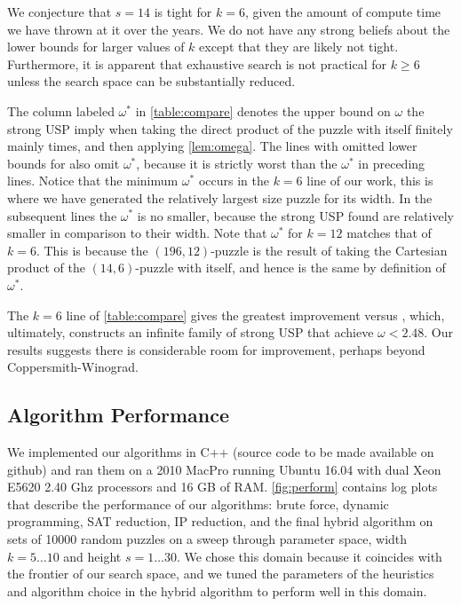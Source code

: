 \documentclass[11pt]{article}
\begin{document}
We conjecture that $s = 14$ is tight for $k = 6$, given the amount of
compute time we have thrown at it over the years.
We do
not have any strong beliefs about the lower bounds for larger values
of $k$ except that they are likely not tight.  Furthermore, it is
apparent that exhaustive search is not practical for $k \ge 6$
unless the search space can be substantially reduced.

The column labeled $\omega^*$ in \autoref{table:compare} denotes the
upper bound on $\omega$ the strong USP imply when taking the direct
product of the puzzle with itself finitely mainly times, and then
applying \autoref{lem:omega}.
The
lines with omitted lower bounds for \cite{cksu05} also omit
$\omega^*$, because it is strictly worst than the $\omega^*$ in
preceding lines.  Notice that the minimum $\omega^*$ occurs in the $k
= 6$ line of our work, this is where we have generated the relatively
largest size puzzle for its width.  In the subsequent lines the
$\omega^*$ is no smaller, because the strong USP found are relatively
smaller in comparison to their width.  Note that $\omega^*$ for $k =
12$ matches that of $k = 6$.  This is because the $(196, 12)$-puzzle
is the result of taking the Cartesian product of the $(14,6)$-puzzle
with itself, and hence is the same by definition of $\omega^*$.

The $k = 6$ line of \autoref{table:compare} gives the greatest
improvement versus \cite[Proposition 3.8]{cksu05}, which, ultimately,
constructs an infinite family of strong USP that achieve $\omega <
2.48$. Our results suggests there is considerable room for
improvement, perhaps beyond Coppersmith-Winograd.


\subsection{Algorithm Performance}
\label{subsec:performance}

We implemented our algorithms in C++ (source code to be made
  available on github) and ran them on a 2010 MacPro running Ubuntu
16.04 with dual Xeon E5620 2.40 Ghz processors and 16 GB of
RAM. \autoref{fig:perform} contains log plots that describe the
performance of our algorithms: brute force, dynamic programming, SAT
reduction, IP reduction, and the final hybrid algorithm on sets of
10000 random puzzles on a sweep through parameter space, width $k = 5
\ldots 10$ and height $s = 1 \ldots 30$.  We chose this domain because
it coincides with the frontier of our search space, and we tuned the
parameters of the heuristics and algorithm choice in the hybrid
algorithm to perform well in this domain.
\end{document}
